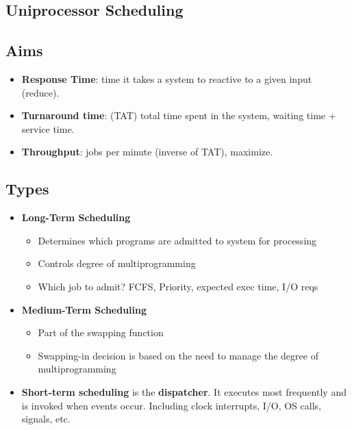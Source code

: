 \documentclass[fontsize=5pt]{scrartcl}
\begin{document}
\begin{multicols}{3}
  \section{Uniprocessor Scheduling}
    \subsection{Aims}
      \begin{itemize}
       \item \textbf{Response Time}: time it takes a system to reactive to a given input (reduce).
       \item \textbf{Turnaround time}: (TAT) total time spent in the system, waiting time + service time.
       \item \textbf{Throughput}: jobs per minute (inverse of TAT), maximize.
      \end{itemize}
      \subsection{Types}
      \begin{itemize}
       \item \textbf{Long-Term Scheduling}
       \begin{itemize}
         \item Determines which programs are admitted to system for processing
         \item Controls degree of multiprogramming
         \item Which job to admit? FCFS, Priority, expected exec time, I/O reqs
       \end{itemize}
       \item \textbf{Medium-Term Scheduling}
       \begin{itemize}
         \item Part of the swapping function
         \item Swapping-in decision is based on the need to manage the degree of multiprogramming
       \end{itemize}
       \item \textbf{Short-term scheduling} is the \textbf{dispatcher}. It executes most frequently and is invoked when events occur. Including clock interrupts, I/O, OS calls, signals, etc.
      \end{itemize}

\end{multicols}
\end{document}
